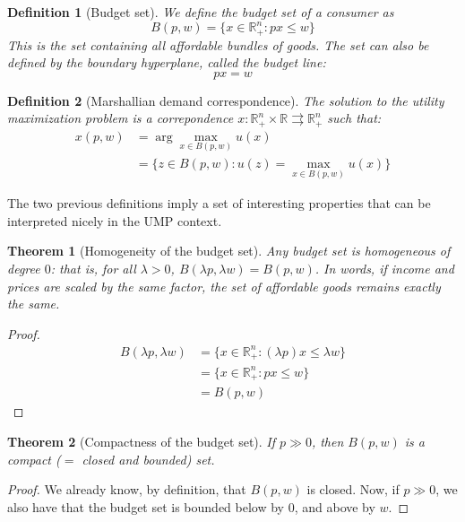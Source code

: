 \documentclass[12pt]{report}
\newtheorem{theorem}{Theorem}[chapter]
\newtheorem{definition}{Definition}[chapter]
\begin{document}
\begin{definition}[Budget set]
We define the budget set of a consumer as $$B(p,w) = \{x\in \mathbb{R}_{+}^n : px\leq w\} $$This is the set containing all affordable bundles of goods. The set can also be defined by the boundary hyperplane, called the budget line: $$px = w$$
\end{definition}

\begin{definition}[Marshallian demand correspondence]
The solution to the utility maximization problem is a correpondence $x:\mathbb{R}_{+}^n \times \mathbb{R} \rightrightarrows \mathbb{R}_{+}^n $ such that: \begin{align*}
x(p, w) & = \operatorname{arg}\max_{x\in B(p,w)} u(x) \\
& = \{z\in B(p,w):u(z) = \max_{x\in B(p,w)} u(x)\}
\end{align*}
\end{definition}

The two previous definitions imply a set of interesting properties that can be interpreted nicely in the UMP context.

\begin{theorem}[Homogeneity of the budget set]
Any budget set is homogeneous of degree $0$: that is, for all $\lambda >0$, $B(\lambda p, \lambda w) = B(p, w)$. In words, if income and prices are scaled by the same factor, the set of affordable goods remains exactly the same.
\end{theorem}

\begin{proof}
\begin{align*}
B(\lambda p, \lambda w) & = \{x\in \mathbb{R}_{+}^n : (\lambda p)x\leq \lambda w\} \\ & = \{x\in \mathbb{R}_{+}^n : px\leq w\} \\ & = B(p, w)
\end{align*}
\end{proof}

\begin{theorem}[Compactness of the budget set]
If $p\gg 0$, then $B(p, w)$ is a compact ($=$ closed and bounded) set.
\end{theorem}

\begin{proof}
We already know, by definition, that $B(p, w)$ is closed. Now, if $p\gg 0$, we also have that the budget set is bounded below by $0$, and above by $w$.
\end{proof}
\end{document}
